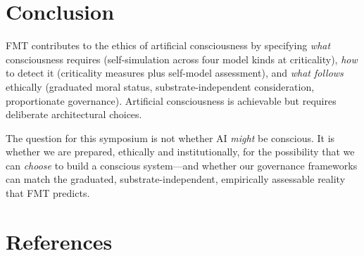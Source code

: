 \documentclass[11pt]{article}
\begin{document}
\section{Conclusion}

FMT contributes to the ethics of artificial consciousness by specifying \emph{what} consciousness requires (self-simulation across four model kinds at criticality), \emph{how} to detect it (criticality measures plus self-model assessment), and \emph{what follows} ethically (graduated moral status, substrate-independent consideration, proportionate governance). Artificial consciousness is achievable but requires deliberate architectural choices.

The question for this symposium is not whether AI \emph{might} be conscious. It is whether we are prepared, ethically and institutionally, for the possibility that we can \emph{choose} to build a conscious system---and whether our governance frameworks can match the graduated, substrate-independent, empirically assessable reality that FMT predicts.

\section*{References}
\end{document}
